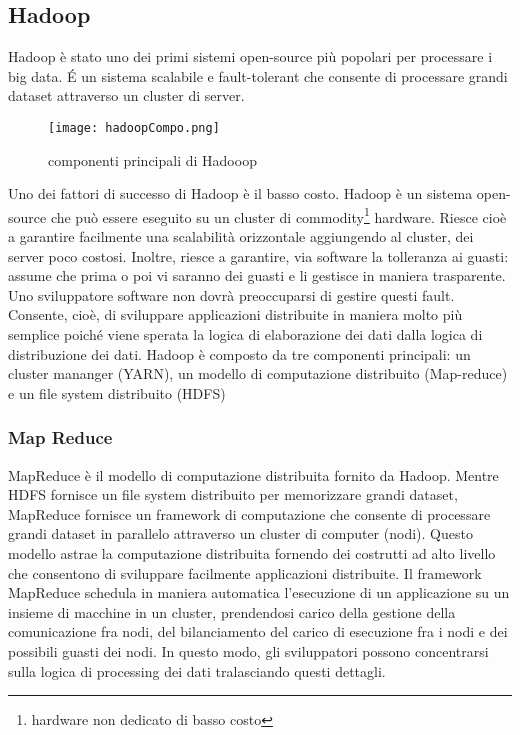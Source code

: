 \subsection{Hadoop}
Hadoop è stato uno dei primi sistemi open-source più popolari per processare i big data.
\'E un sistema scalabile e fault-tolerant che consente di processare grandi dataset attraverso un cluster di server.  


\begin{figure}[h]
\centering
\texttt{[image: hadoopCompo.png]}
\caption{componenti principali di Hadooop}
\label{fig:hadoopComponets}
\end{figure} 
 
Uno dei fattori di successo di Hadoop è il basso costo. Hadoop è un sistema open-source che può essere eseguito su un cluster di commodity\footnote{hardware non dedicato di basso costo} hardware. Riesce cioè a garantire facilmente una scalabilità orizzontale aggiungendo al cluster, dei server poco costosi. Inoltre, riesce a garantire, via software la tolleranza ai guasti: assume che prima o poi vi saranno dei guasti e li gestisce in maniera trasparente. Uno sviluppatore software non dovrà preoccuparsi di gestire questi fault. Consente, cioè, di sviluppare applicazioni distribuite in maniera molto più semplice poiché viene sperata la logica di elaborazione dei dati dalla logica di distribuzione dei dati.
Hadoop è composto da tre componenti principali: un cluster mananger (YARN), un modello di computazione distribuito (Map-reduce) e un file system distribuito (HDFS)



 
 \subsubsection{Map Reduce}
 MapReduce è il modello di computazione distribuita fornito da Hadoop. Mentre HDFS fornisce un file system distribuito per memorizzare grandi dataset, MapReduce fornisce un framework di computazione che consente di processare grandi dataset in parallelo attraverso un cluster di computer (nodi). Questo modello astrae la computazione distribuita fornendo dei costrutti ad alto livello che consentono di sviluppare facilmente applicazioni distribuite.
 Il framework MapReduce schedula in maniera automatica l'esecuzione di un applicazione su un insieme di macchine in un cluster, prendendosi carico  della gestione della comunicazione fra nodi, del bilanciamento del carico di esecuzione fra i nodi e dei possibili guasti dei nodi.
In questo modo, gli sviluppatori possono concentrarsi sulla logica di processing dei dati tralasciando questi dettagli.

